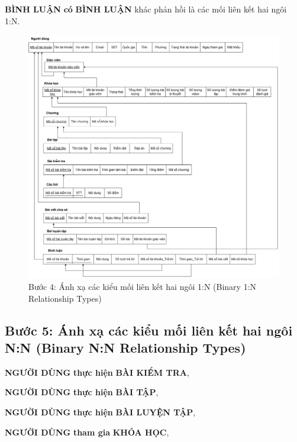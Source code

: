 \textbf{BÌNH LUẬN} \textbf{có} \textbf{BÌNH LUẬN} khác phản hồi là các mối liên kết hai ngôi 1:N.
\begin{figure}[H]
    \centering
    \includegraphics[width=1\linewidth]{picture/lk1-n.png}
    \caption{Bước 4: Ánh xạ các kiểu mối liên kết hai ngôi 1:N (Binary	1:N	Relationship Types)}
    \label{fig:placeholder}
\end{figure}
\vspace{-30pt}
\subsection{Bước 5: Ánh xạ các kiểu mối liên kết hai ngôi N:N (Binary	N:N	Relationship Types)}
\textbf{NGƯỜI DÙNG} \textbf{thực hiện} \textbf{BÀI KIỂM TRA}, 

\textbf{NGƯỜI DÙNG} \textbf{thực hiện} \textbf{BÀI TẬP},

\textbf{NGƯỜI DÙNG} \textbf{thực hiện} \textbf{BÀI LUYỆN TẬP},

\textbf{NGƯỜI DÙNG} \textbf{tham gia} \textbf{KHÓA HỌC},

